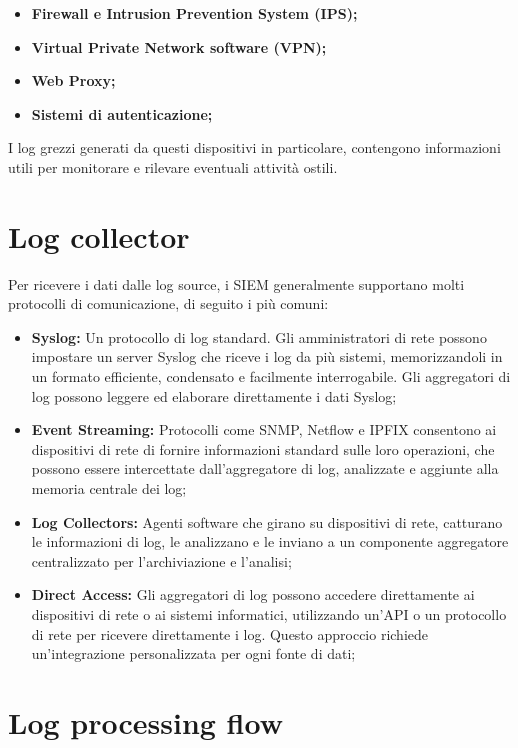 \begin{itemize}
    \item\textbf{Firewall e Intrusion Prevention System (IPS);}
    \item\textbf{Virtual Private Network software (VPN);}
    \item\textbf{Web Proxy;} 
    \item\textbf{Sistemi di autenticazione;}
\end{itemize}

I log grezzi generati da questi dispositivi in particolare, contengono informazioni utili per monitorare e rilevare eventuali attività ostili.

\section{Log collector}
\label{sec:Log collector}

Per ricevere i dati dalle log source, i SIEM generalmente supportano molti protocolli di comunicazione, di seguito i più comuni: 

\begin{itemize}
    \item\textbf{Syslog:} Un protocollo di log standard. Gli amministratori di rete possono impostare un server Syslog che riceve i log da più sistemi, memorizzandoli in un formato efficiente, condensato e facilmente interrogabile.
    Gli aggregatori di log possono leggere ed elaborare direttamente i dati Syslog;
    \item\textbf{Event Streaming:} Protocolli come SNMP, Netflow e IPFIX consentono ai dispositivi di rete di fornire informazioni standard sulle loro operazioni, che possono essere intercettate dall'aggregatore di log, analizzate e aggiunte alla memoria centrale dei log;
    \item\textbf{Log Collectors:} Agenti software che girano su dispositivi di rete, catturano le informazioni di log, le analizzano e le inviano a un componente aggregatore centralizzato per l'archiviazione e l'analisi;
    \item\textbf{Direct Access:} Gli aggregatori di log possono accedere direttamente ai dispositivi di rete o ai sistemi informatici, utilizzando un'API o un protocollo di rete per ricevere direttamente i log. Questo approccio richiede un'integrazione personalizzata per ogni fonte di dati;
\end{itemize}

\newpage

\section{Log processing flow}
\label{sec:Log processing flow}

